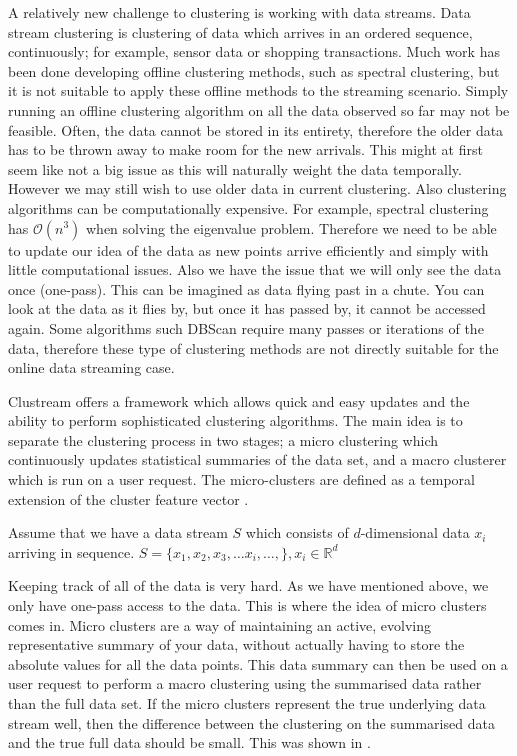 \documentclass[12pt]{report}		%
\begin{document}
A relatively new challenge to clustering is working with data streams. Data stream clustering is clustering of data which arrives in an ordered sequence, continuously; for example, sensor data or shopping transactions. Much work has been done developing offline clustering methods, such as spectral clustering, but it is not suitable to apply these offline methods to the streaming scenario. Simply running an offline clustering algorithm on all the data observed so far may not be feasible. Often, the data cannot be stored in its entirety, therefore the older data has to be thrown away to make room for the new arrivals. This might at first seem like not a big issue as this will naturally weight the data temporally. However we may still wish to use older data in current clustering. Also clustering algorithms can be computationally expensive. For example, spectral clustering has $\mathcal{O}(n^3)$ when solving the eigenvalue problem. Therefore we need to be able to update our idea of the data as new points arrive efficiently and simply with little computational issues. Also we have the issue that we will only see the data once (one-pass). This can be imagined as data flying past in a chute. You can look at the data as it flies by, but once it has passed by, it cannot be accessed again. Some algorithms such DBScan require many passes or iterations of the data, therefore these type of clustering methods are not directly suitable for the online data streaming case. 

Clustream \cite{Aggarwal2003} offers a framework which allows quick and easy updates and the ability to perform sophisticated clustering algorithms. The main idea is to separate the clustering process in two stages;  a micro clustering which continuously updates statistical summaries of the data set, and a macro clusterer which is run on a user request. The micro-clusters are defined as a temporal extension of the cluster feature vector \cite{Zhang1996a}. 

Assume that we have a data stream $S$ which consists of $d$-dimensional data $x_i$ arriving in sequence. $S = \{ x_1, x_2, x_3, \hdots x_i, \hdots, \}, x_i \in \mathbb{R}^d$ 

Keeping track of all of the data is very hard. As we have mentioned above, we only have one-pass access to the data. This is where the idea of micro clusters comes in. Micro clusters are a way of maintaining an active, evolving representative summary of your data, without actually having to store the absolute values for all the data points. This data summary can then be used on a user request to perform a macro clustering using the summarised data rather than the full data set. If the micro clusters represent the true underlying data stream well, then the difference between the clustering on the summarised data and the true full data should be small. This was shown in \cite{Yan2009}. 
\end{document}
